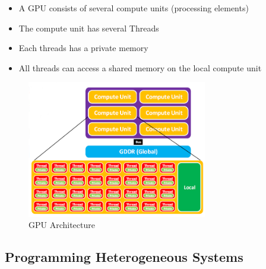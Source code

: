 \begin{itemize}
\tightlist
\item
  A GPU consists of several compute units (processing elements)
\item
  The compute unit has several Threads
\item
  Each threads has a private memory
\item
  All threads can access a shared memory on the local compute unit
\end{itemize}

\begin{figure}[H]
\centering
\includegraphics[width=0.7\textwidth]{figures/gpu_architecture.png}
\caption{GPU Architecture}
\end{figure}

\hypertarget{programming-heterogeneous-systems}{%
\subsection{Programming Heterogeneous
Systems}\label{programming-heterogeneous-systems}}

